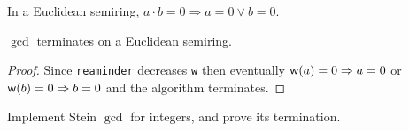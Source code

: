 \begin{lemma}
	In a Euclidean semiring, $a \cdot b = 0 \Rightarrow a = 0 \vee b = 0$.
\end{lemma}

\begin{lemma}
	$\gcd$ terminates on a Euclidean semiring.
\end{lemma}

\begin{proof}
	Since \verb|reaminder| decreases \verb|w| then eventually $\mathsf{w}(a) = 0 \Rightarrow a = 0$ or
	$\mathsf{w}(b) = 0 \Rightarrow b = 0$ and the algorithm terminates.
\end{proof}

\begin{exercise}
	Implement Stein $\gcd$ for integers, and prove its termination.
\end{exercise}
